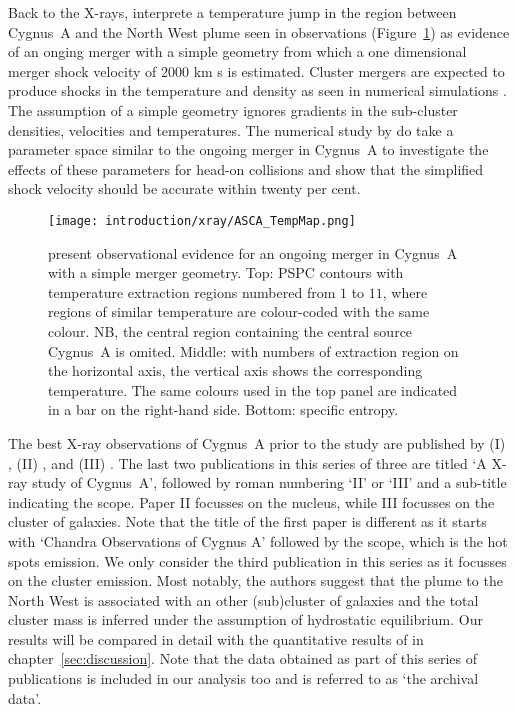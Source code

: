 \documentclass[MScProj_TLRH_ClusterEnergy.tex]{subfiles}
\begin{document}
Back to the X-rays, \citet{1999ApJ...521..526M} interprete a temperature jump 
in the region between Cygnus~A and the North West plume seen in  
observations (Figure~\ref{fig:ASCA_TempMap}) as evidence of an onging merger with
a simple geometry from which a one dimensional merger shock velocity of
\mytilde $2000$ km s
is estimated. Cluster mergers are expected to produce shocks in the temperature and 
density as seen in numerical simulations \citep[e.g.][]{1998Sci...280..400B}. The 
assumption of a simple geometry ignores gradients in the sub-cluster densities, 
velocities and temperatures. The numerical study by \citet{2001ApJ...561..621R} do 
take a parameter space similar to the ongoing merger in Cygnus~A to investigate the effects
of these parameters for head-on collisions and show that the simplified shock velocity
should be accurate within twenty per cent.

\begin{figure}
\centering
\texttt{[image: introduction/xray/ASCA\_TempMap.png]}
\caption{\citet{1999ApJ...521..526M} present observational evidence for
         an ongoing merger in Cygnus~A with a simple merger geometry. Top:
          PSPC \citep{1996MNRAS.278..479R} contours with
          temperature extraction regions numbered from 
         $1$ to $11$, where regions of similar temperature are colour-coded
         with the same colour. NB, the central region containing the central
         source Cygnus~A is omited. Middle: with numbers of extraction region
         on the horizontal axis, the vertical axis shows the corresponding
         temperature. The same colours used in the top panel are indicated
         in a bar on the right-hand side. Bottom: specific entropy. }
\label{fig:ASCA_TempMap}
\end{figure}

The best X-ray observations of Cygnus~A prior to the \citet{2014cxo..prop.4448W} study
are published by (I) \citet{2000ApJ...544L..27W}, (II) \citet{2002ApJ...564..176Y},
and (III) \citet{2002ApJ...565..195S}. The last two publications in this series of
three are titled `A  X-ray study of Cygnus~A', followed by roman
numbering `II' or `III' and a sub-title indicating the scope. Paper II focusses on
the nucleus, while III focusses on the cluster of galaxies. Note that the title of 
the first paper is different as it starts with `Chandra Observations of Cygnus A' 
followed by the scope, which is the hot spots emission. We only consider
the third publication in this series as it focusses on the cluster emission. Most notably,
the authors suggest that the plume to the North West is associated with
an other (sub)cluster of galaxies and the total cluster mass is inferred under the assumption of 
hydrostatic equilibrium. Our results will be compared in detail with the quantitative results
of \citet{2002ApJ...565..195S} in chapter~\ref{sec:discussion}. Note that the
data obtained as part of this series of publications is included in our analysis too and
is referred to as `the archival data'.
\end{document}
